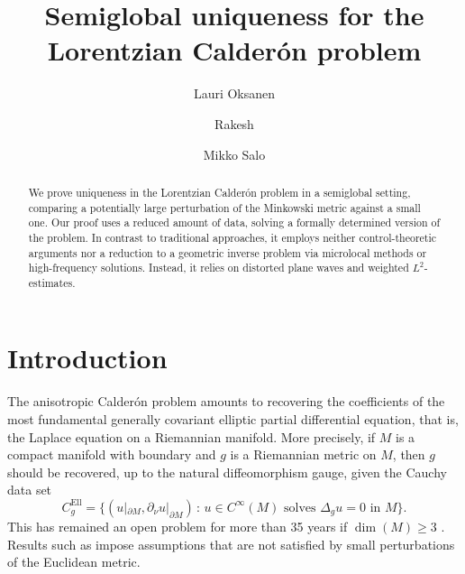 \documentclass[11pt,letterpaper]{amsart}
\theoremstyle{definition}
\numberwithin{equation}{section}
\newcommand{\p}{\partial}
\def\p{\partial}
\def\mid{\,:\,}
\begin{document}
\title{Semiglobal uniqueness for the Lorentzian Calder\'on problem} 

\author[L. Oksanen]{Lauri Oksanen}
\address{Department of Mathematics and Statistics, University of Helsinki, PO Box 68, 00014 Helsinki, Finland}

\author{Rakesh}
\address{Department of Mathematical Sciences, University of Delaware, Newark, DE 19716, USA}

\author[M. Salo]{Mikko Salo}
\address{Department of Mathematics and Statistics, University of Jyv\"askyl\"a, PO Box 35, 40014 Jyv\"askyl\"a, Finland}











\begin{abstract}
We prove uniqueness in the Lorentzian Calder\'on problem in a semiglobal setting, comparing a potentially large perturbation of the Minkowski metric against a small one. Our proof uses a reduced amount of data, solving a formally determined version of the problem. In contrast to traditional approaches, it employs neither control-theoretic arguments nor a reduction to a geometric inverse problem via microlocal methods or high-frequency solutions. Instead, it relies on distorted plane waves and weighted $L^2$-estimates. 
\end{abstract}

\maketitle


\section{Introduction} \label{sec_intro}

The anisotropic Calder\'on problem amounts to recovering the coefficients of the most fundamental generally covariant elliptic partial differential equation, that is, the Laplace equation on a Riemannian manifold. More precisely, if $M$ is a compact manifold with boundary and $g$ is a Riemannian metric on $M$, then $g$ should be recovered, up to the natural diffeomorphism gauge, given the Cauchy data set 
\[
C_g^{\mathrm{Ell}} = \{ (u|_{\p M}, \p_{\nu} u|_{\p M}) \mid u \in C^{\infty}(M) \text{ solves } \Delta_g u = 0 \text{ in $M$} \}.
\]
This has remained an open problem for more than 35 years if $\dim(M) \geq 3$ \cite{lee1989}. Results such as \cite{sylvester1987, lassas2001, dos-santos-ferreira2009} impose assumptions that are not satisfied by small perturbations of the Euclidean metric. 
\end{document}
